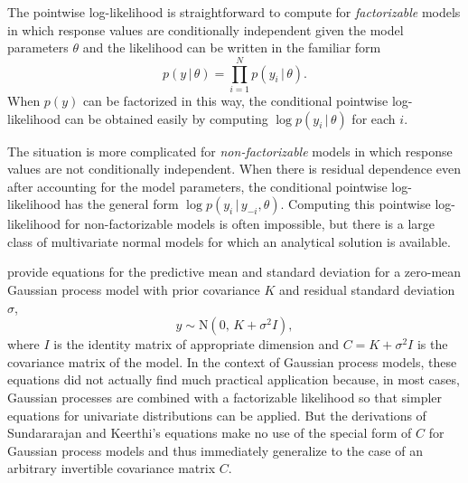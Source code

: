 \documentclass[11pt]{article}
\begin{document}
The pointwise log-likelihood is straightforward to compute for
\emph{factorizable} models in which response values are conditionally
independent given the model parameters $\theta$ and the likelihood can be
written in the familiar form
%
\begin{equation}
p(y \,|\, \theta) = \prod_{i=1}^N p(y_i \,|\, \theta).
\end{equation}
%
When $p(y)$ can be factorized in this way, the conditional pointwise
log-likelihood can be obtained easily by computing $\log p(y_i \,|\, \theta)$
for each $i$.

The situation is more complicated for \emph{non-factorizable} models in which
response values are not conditionally independent. When there is residual
dependence even after accounting for the model parameters, the conditional
pointwise log-likelihood has the general form $\log p(y_i \,|\, y_{-i},
\theta)$. Computing this pointwise log-likelihood for non-factorizable models is 
often impossible, but there is a large class of multivariate normal models for which 
an analytical solution is available.

\cite{sundararajan2001} provide equations for the predictive mean and standard
deviation for a zero-mean Gaussian process model with prior covariance $K$ and
residual standard deviation $\sigma$,
%
\begin{equation}
\label{gp}
y \sim {\mathrm N}(0, \, K+\sigma^2 I),
\end{equation}
%
where $I$ is the identity matrix of appropriate dimension and $C = K+\sigma^2 I$
is the covariance matrix of the model. In the context of Gaussian process models, 
these equations did not actually find much practical application because, in most
cases, Gaussian processes are combined with a factorizable likelihood so that
simpler equations for univariate distributions can be applied. But the
derivations of Sundararajan and Keerthi's equations make no use of the special
form of $C$ for Gaussian process models and thus immediately generalize to the
case of an arbitrary invertible covariance matrix $C$.
\end{document}
